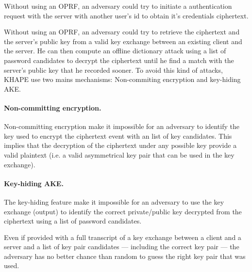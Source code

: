 \documentclass[../report.tex]{subfiles}
\begin{document}
Without using an OPRF, an adversary could try to initiate a authentication request with the server with another user's id to obtain it's credentials ciphertext.

Without using an OPRF, an adversary could try to retrieve the ciphertext and the server's public key from a valid key exchange between an existing client and the server.
He can then compute an offline dictionary attack using a list of password candidates to decrypt the ciphertext until he find a match with the server's public key that he recorded sooner.
To avoid this kind of attacks, KHAPE use two mains mechanisms: Non-commiting encryption and key-hiding AKE.

\paragraph{Non-committing encryption.} \label{sec:non_committing_encryption}
Non-committing encryption make it impossible for an adversary to identify the key used to encrypt the ciphertext event with an list of key candidates. This implies that the decryption of the ciphertext under any possible key provide a valid plaintext (i.e. a valid asymmetrical key pair that can be used in the key exchange).

\paragraph{Key-hiding AKE.} \label{sec:key_hiding_ake}
The key-hiding feature make it impossible for an adversary to use the key exchange (output) to identify the correct private/public key decrypted from the ciphertext using a list of password candidates.

Even if provided with a full transcript of a key exchange between a client and a server and a list of key pair candidates --- including the correct key pair --- the adversary has no better chance than random to guess the right key pair that was used.






% 
% 
\end{document}
